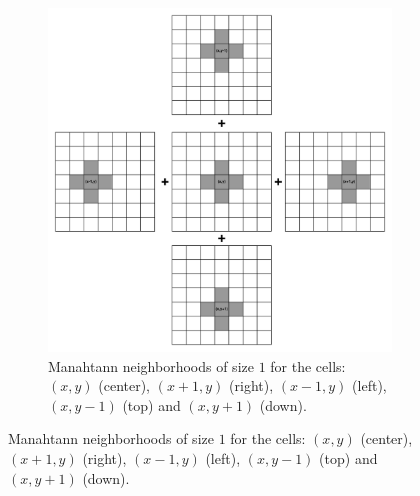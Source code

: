 \begin{figure}
    \vspace*{-0.5in}
    \centering
    
    \begin{subfigure}[t]{1.0\textwidth}
        \centering
        \includegraphics[width=\textwidth]{sources/max_manhattan/images/neighborhoodDP1_1}
        \caption[]{Manahtann neighborhoods of size $1$ for the cells:  $(x,y)$ (center), $(x+1,y)$ (right), $(x-1,y)$ (left), $(x,y-1)$ (top) and $(x,y+1)$ (down).}
        \label{fig:max_manhattan:neighborhoodDP1_1}
     \end{subfigure}
    
     \hfill
    

\end{figure}
